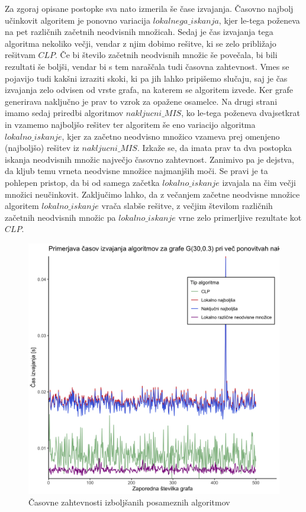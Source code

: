 \documentclass[a4paper, 12pt]{article}
\begin{document}
\noindent Za zgoraj opisane postopke sva nato izmerila še čase izvajanja. Časovno najbolj učinkovit algoritem je ponovno variacija $lokalnega\_iskanja$, kjer le-tega poženeva na pet različnih začetnih neodvisnih množicah. Sedaj je 
čas izvajanja tega algoritma nekoliko večji, vendar z njim dobimo rešitve, ki se zelo približajo rešitvam $CLP$. Če bi število začetnih neodvisnih množic še povečala, bi bili rezultati še boljši, vendar bi s tem naraščala tudi časovna zahtevnost. 
Vmes se pojavijo tudi kakšni izraziti skoki, ki pa jih lahko pripišemo slučaju, saj je čas izvajanja zelo odvisen od vrste grafa, na katerem se algoritem izvede.
Ker grafe generirava naključno je prav to vzrok za opažene osamelce. Na drugi strani imamo sedaj priredbi algoritmov $nakljucni\_MIS$, ko le-tega poženeva dvajsetkrat in vzamemo najboljšo rešitev
ter algoritem še eno variacijo algoritma $lokalno\_iskanje$, kjer za začetno neodvisno množico vzameva prej omenjeno (najboljšo) rešitev iz $nakljucni\_MIS$. Izkaže se, da imata prav ta dva postopka iskanja neodvisnih množic največjo časovno zahtevnost.
Zanimivo pa je dejstva, da kljub temu vrneta neodvisne množice najmanjših moči. Se pravi je ta pohlepen pristop, da bi od samega začetka $lokalno\_iskanje$ izvajala na čim večji množici neučinkovit.
Zaključimo lahko, da z večanjem začetne neodvisne množice algoritem $lokalno\_iskanje$ vrača slabše rešitve, z večjim številom različnih začetnih neodvisnih množic pa $lokalno\_iskanje$ vrne zelo primerljive rezultate kot $CLP$.
\begin{figure}[h!]
	\begin{center}
		\includegraphics[scale=0.12]{R_koda/pon-casi-maxi.png}
		\caption{Časovne zahtevnosti izboljšanih posameznih algoritmov}
	\end{center}
\end{figure}
\end{document}
